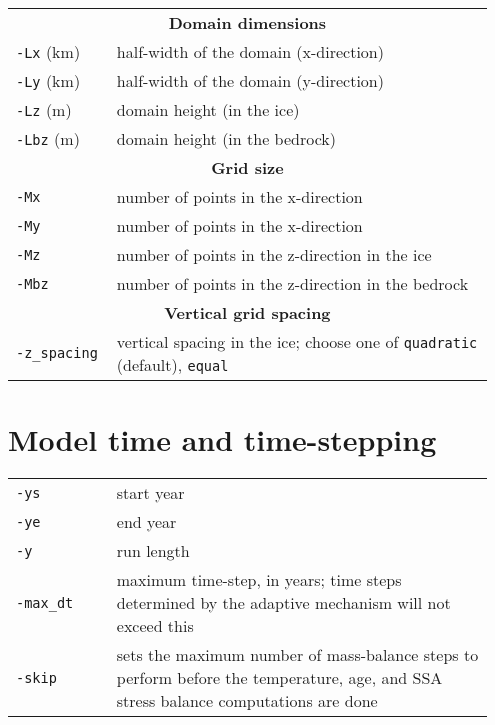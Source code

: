 \documentclass[landscape]{article}
\newcommand{\tabletitle}[1]{\multicolumn{2}{c}{\textbf{#1}}}
\begin{document}
\begin{textblock}{15}
\begin{tabular}{@{}p{0.2\linewidth}p{0.75\linewidth}@{}}
\tabletitle{Domain dimensions} \\
 \texttt{-Lx} (km) & half-width of the domain \mbox{(x-direction)}\\
  \texttt{-Ly} (km) & half-width of the domain \mbox{(y-direction)}\\
  \texttt{-Lz} (m) & domain height (in the ice)\\
  \texttt{-Lbz} (m) & domain height (in the bedrock)\\
\tabletitle{Grid size} \\
 \texttt{-Mx} & number of points in the x-direction\\
  \texttt{-My} & number of points in the x-direction\\
  \texttt{-Mz} & number of points in the z-direction in the ice\\
  \texttt{-Mbz} & number of points in the z-direction in the bedrock\\
\tabletitle{Vertical grid spacing} \\
 \texttt{-z_spacing} & vertical spacing in the ice; choose one of \texttt{quadratic} (default), \texttt{equal}\\
\end{tabular}

\section{Model time and time-stepping}
\label{sec:model-time} \label{sec:time-stepping}
\begin{tabular}{@{}p{0.2\linewidth}p{0.75\linewidth}@{}}
  \texttt{-ys} & start year \\
  \texttt{-ye} & end year \\
  \texttt{-y} & run length \\
  \texttt{-max_dt} & maximum time-step, in years; time steps determined by
  the adaptive mechanism will not exceed this\\
  \texttt{-skip} &  sets the maximum number of mass-balance steps to perform
  before the temperature, age, and SSA stress balance computations
  are done\\
\end{tabular}

\end{textblock}
\end{document}

